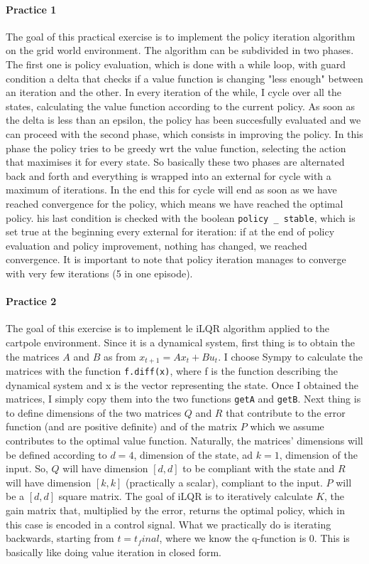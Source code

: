 \documentclass[14pt,a4paper]{extarticle}
\def\code#1{\texttt{#1}}
\begin{document}
\paragraph{Practice 1}

The goal of this practical exercise is to implement the policy iteration algorithm on the grid world environment. The algorithm can be subdivided in two phases. The first one is policy evaluation, which is done with a while loop, with guard condition a delta that checks if a value function is changing "less enough" between an iteration and the other. In every iteration of the while, I cycle over all the states, calculating the value function according to the current policy. As soon as the delta is less than an epsilon, the policy has been succesfully evaluated and we can proceed with the second phase, which consists in improving the policy. In this phase the policy tries to be greedy wrt the value function, selecting the action that maximises it for every state. So basically these two phases are alternated back and forth and everything is wrapped into an external for cycle with a maximum of iterations. In the end this for cycle will end as soon as we have reached convergence for the policy, which means we have reached the optimal policy. his last condition is checked with the boolean \code{policy \_ stable}, which is set true at the beginning every external for iteration: if at the end of policy evaluation and policy improvement, nothing has changed, we reached convergence. It is important to note that policy iteration manages to converge with very few iterations (5 in one episode).




\paragraph{Practice 2}

The goal of this exercise is to implement le iLQR algorithm applied to the cartpole environment. Since it is a dynamical system, first thing is to obtain the the matrices $A$ and $B$ as from \(x_{t+1} = Ax_t+Bu_t\). I choose Sympy to calculate the matrices with the function \code{f.diff(x)}, where f is the function describing the dynamical system and x is the vector representing the state. Once I obtained the matrices, I simply copy them into the two functions \code{getA} and \code{getB}. Next thing is to define dimensions of the two matrices $Q$ and $R$ that contribute to the error function (and are positive definite) and of the matrix $P$ which we assume contributes to the optimal value function. Naturally, the matrices' dimensions will be defined according to $d=4$, dimension of the state, ad $k=1$, dimension of the input. So, $Q$ will have dimension $[d,d]$ to be compliant with the state and $R$ will have dimension $[k,k]$ (practically a scalar), compliant to the input. $P$ will be a $[d,d]$ square matrix. The goal of iLQR is to iteratively calculate $K$, the gain matrix that, multiplied by the error, returns the optimal policy, which in this case is encoded in a control signal. What we practically do is iterating backwards, starting from $t = t_final$, where we know the q-function is 0. This is basically like doing value iteration in closed form.
\end{document}
